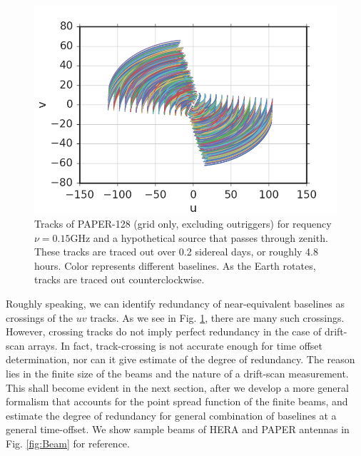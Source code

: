 \documentclass[twocolumn,apj,numberedappendix]{emulateapj}
\renewcommand\[{\begin{equation}}
\renewcommand\]{\end{equation}}
\begin{document}
\begin{figure}[H]
\includegraphics[width=\linewidth]{tracks128}
\caption{Tracks of PAPER-128 (grid only, excluding outriggers) for requency $\nu=0.15\text{GHz}$ and a hypothetical source that passes through zenith.
These tracks are traced out over 0.2 sidereal days, or roughly 4.8
hours. Color represents different baselines. 
As the Earth rotates, tracks are traced out counterclockwise. }
\label{fig:Tracks}
\end{figure}

Roughly speaking, we can identify
redundancy of near-equivalent baselines as crossings
of the $uv$ tracks. As we see in Fig. \ref{fig:Tracks}, there are many such crossings. However, crossing tracks do not imply perfect redundancy in the case of drift-scan arrays. In fact, track-crossing is
not accurate enough for time offset determination, nor can it give estimate of the degree of redundancy.  The reason lies in the finite size of the beams and the nature of a drift-scan measurement. This shall become evident in the next section, after we develop a more general formalism that accounts for the point spread function of the finite beams, and estimate the degree of redundancy for general combination of baselines at a general time-offset. We show sample beams of HERA and PAPER antennas in Fig. \ref{fig:Beam} for reference. 
\end{document}
